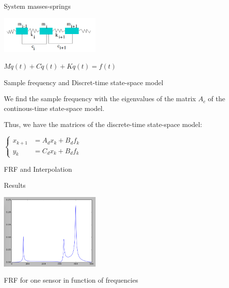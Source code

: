 \documentclass{beamer}
\begin{document}
\begin{frame}{System masses-springs}
\begin{center}
\includegraphics[width=5cm]{images/ressorts.png}

$M \ddot{q}(t) + C \dot{q}(t) + K q(t) = f(t)$
\end{center}




\end{frame}


\begin{frame}{Sample frequency and Discret-time state-space model}

We find the sample frequency with the eigenvalues of the matrix $A_c$ of the continous-time state-space model.

\vspace{5mm}

Thus, we have the matrices of the discrete-time state-space model:
\begin{center}
$\left\{
\begin{array}{ll}
x_{k+1} & = A_dx_k + B_df_k \\
y_k & = C_dx_k + B_df_k
\end{array}
\right.$
\end{center}

\end{frame}

\begin{frame}{FRF and Interpolation}
\end{frame}

\begin{frame}{Results}
\begin{center}
\includegraphics[width=5cm]{images/FRF_freq.png}

FRF for one sensor in function of frequencies
\end{center}
\end{frame}
\end{document}
